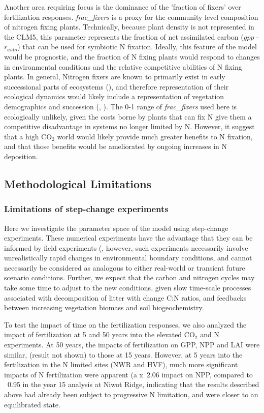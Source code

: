 \documentclass[draft,linenumbers]{agujournal}
\begin{document}
Another area requiring focus is the dominance of the 'fraction of fixers' over fertilization responses. \emph{frac\_fixers} is a proxy for the community level composition of nitrogen fixing plants. Technically, because plant density is not represented in the CLM5, this parameter represents the fraction of net assimilated carbon ($gpp$ - $r_{auto}$) that can be used for symbiotic N fixation. Ideally, this feature of the model would be prognostic, and the fraction of N fixing plants would respond to changes in environmental conditions and the relative competitive abilities of N fixing plants. In general, Nitrogen fixers are known to primarily exist in early successional parts of ecosystems (\cite{vitousek1989}), and therefore representation of their ecological dynamics would likely include a representation of vegetation demographics and succession (\cite{fisher2018vegetation}, \cite{trugman2016climate}). The 0-1 range of \emph{frac\_fixers} used here is ecologically unlikely, given the costs borne by plants that can fix N give them a competitive disadvantage in systems no longer limited by N. However, it suggest that a high CO$_{2}$ world would likely provide much greater benefits to N fixation, and that those benefits would be ameliorated by ongoing increases in N deposition.

\subsection{ Methodological Limitations}
\subsubsection{Limitations of step-change experiments}
Here we investigate the parameter space of the model using step-change experiments. These numerical experiments have the advantage that they can be informed by field experiments (\cite{wieder2019}, however, such experiments necessarily involve unrealistically rapid changes in environmental boundary conditions, and cannot necessarily be considered as analogous to either real-world or transient future scenario conditions. Further, we expect that the carbon and nitrogen cycles may take some time to adjust to the new conditions, given slow time-scale processes associated with decomposition of litter with change C:N ratios, and feedbacks between increasing vegetation biomass and soil biogeochemistry.

To test the impact of time on the fertilization responses, we also analyzed the impact of fertilization at 5 and 50 years into the elevated CO$_{2}$ and N experiments. At 50 years, the impacts of fertilization on GPP, NPP and LAI were similar, (result not shown) to those at 15 years.  However, at 5 years into the fertilization in the N limited sites (NWR and HVF), much more significant impacts of N fertilization were apparent (a x~2.06 impact on NPP, compared to ~0.95 in the year 15 analysis at Niwot Ridge, indicating that the results described above had already been subject to progressive N limitation, and were closer to an equilibrated state.
\end{document}
